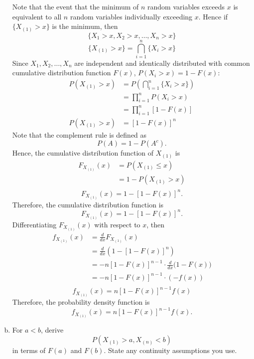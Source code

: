 \documentclass[letterpaper,12pt]{article}
\begin{document}
\begin{enumerate}[(a)]
\begin{list}{}{}
        Note that the event that the minimum of $n$ random variables exceeds $x$ is equivalent to all $n$ random variables individually exceeding $x$.
        Hence if $\{X_{(1)} > x\}$ is the minimum, then
        \[        \{X_1 > x, X_2 > x, \dots, X_n > x\}        \]
        \[        \{X_{(1)} > x\} = \bigcap_{i=1}^{n} \{X_i > x\}        \]
        Since $X_1, X_2, \dots, X_n$ are  independent and identically distributed with common cumulative distribution function $F(x)$, $P(X_i > x) = 1 - F(x)$:
        \begin{align*}
        P(X_{(1)} > x) &= P\left( \bigcap_{i=1}^{n} \{X_i > x\} \right) \\
        &= \prod_{i=1}^{n} P(X_i > x) \\
        &= \prod_{i=1}^{n} [1 - F(x)] \\
         P(X_{(1)} > x) &= [1 - F(x)]^n
        \end{align*}
        Note that the complement rule is defined as
        \[      P(A) = 1 - P(A^c).      \]
        Hence, the cumulative distribution function of $X_{(1)}$ is
        \begin{align*}
        F_{X_{(1)}}(x) &= P(X_{(1)} \le x) \\
        & = 1 - P(X_{(1)} > x) \\
        \end{align*}
        \[\boxed{F_{X_{(1)}}(x) = 1 - [1 - F(x)]^n.}\]
        Therefore, the cumulative distribution function is
        \[F_{X_{(1)}}(x) = 1 - [1 - F(x)]^n.\]
        Differentiating $F_{X_{(1)}}(x)$ with respect to $x$, then
        \begin{align*}
        f_{X_{(1)}}(x) &= \frac{d}{dx} F_{X_{(1)}}(x) \\
        &= \frac{d}{dx} \left( 1 - [1 - F(x)]^n \right) \\
        &= -n [1 - F(x)]^{n-1} \cdot \frac{d}{dx} \big( 1 - F(x) \big) \\
        &= -n [1 - F(x)]^{n-1} \cdot (-f(x)) \\
        \end{align*}
        \[  \boxed{ f_{X_{(1)}}(x) = n [1 - F(x)]^{n-1} f(x)}\]
        Therefore, the probability density function is
        \[       f_{X_{(1)}}(x)= n [1 - F(x)]^{n-1} f(x).        \]
    \end{list}
    \item For $a < b$, derive
    \[    P(X_{(1)} > a, X_{(n)} < b)    \]
    in terms of $F(a)$ and $F(b)$. State any continuity assumptions you use.
   \vspace{0.5em}
\end{enumerate}
\end{document}
